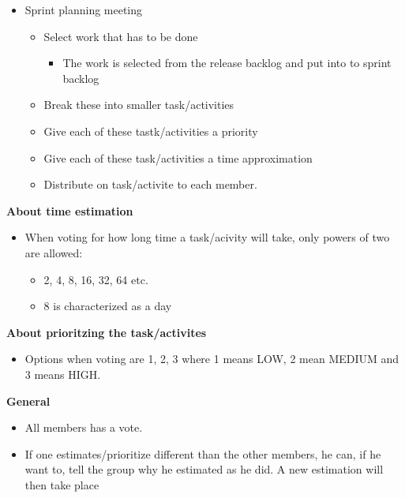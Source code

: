 \begin{framed}
\begin{itemize}
    \item Sprint planning meeting
    \begin{itemize}
        \item Select work that has to be done
        \begin{itemize}
            \item The work is selected from the release backlog and put into to
                sprint backlog
        \end{itemize}
        \item Break these into smaller task/activities
        \item Give each of these tastk/activities a priority 
        \item Give each of these task/activities a time approximation
        \item Distribute on task/activite to each member. 
    \end{itemize}
\end{itemize}

\textbf{About time estimation}
\begin{itemize}
    \item When voting for how long time a task/acivity will take, only powers of two are allowed:
        \begin{itemize}
            \item 2, 4, 8, 16, 32, 64 etc.
            \item 8 is characterized as a day
        \end{itemize}
\end{itemize}

\textbf{About prioritzing the task/activites}
\begin{itemize}
    \item Options when voting are 1, 2, 3 where 1 means LOW, 2 mean MEDIUM and
        3 means HIGH. 
\end{itemize}

\textbf{General}
\begin{itemize}
    \item All members has a vote. 
    \item If one estimates/prioritize different than the other members, he can,
        if he want to, tell the group why he estimated as
        he did. A new estimation will then take place 
\end{itemize}
\end{framed}
